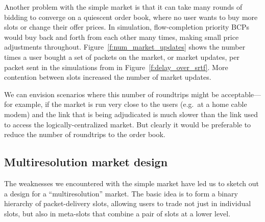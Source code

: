 Another problem with the simple market is that it can take many rounds
of bidding
to converge on a quiescent order book, where no user wants to buy more slots or change their offer prices. In
simulation, flow-completion priority BCPs would buy back and forth from each other many times, making small price adjustments throughout.  
Figure~\ref{f:num_market_updates} shows the number times a user bought a set of packets on the market, or market updates, per packet sent in the simulations from in Figure~\ref{f:delay_over_srtf}.
More contention between slots increased the number of market updates.

We can envision scenarios where this number of roundtrips might be
acceptable---for example, if the market is run very close to the users
(e.g.~at a home cable modem) and the link that is being adjudicated is
much slower than the link used to access the logically-centralized
market. But clearly it would be preferable to reduce the number of
roundtrips to the order book.

\subsection{Multiresolution market design}
\label{ss:multires}

The weaknesses we encountered with the simple market have led us to
sketch out a design for a ``multiresolution'' market. The basic idea
is to form a binary hierarchy of packet-delivery slots, allowing users
to trade not just in individual slots, but also in meta-slots that
combine a pair of slots at a lower level.

